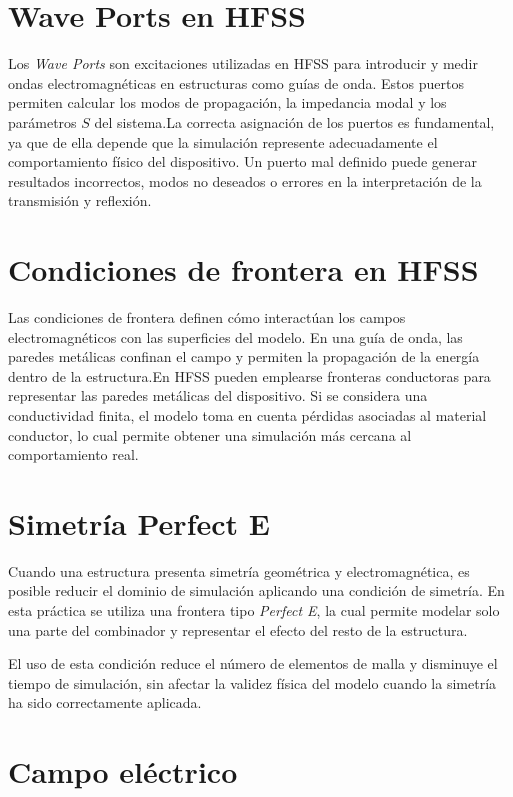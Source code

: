 \section{Wave Ports en HFSS}

Los \textit{Wave Ports} son excitaciones utilizadas en HFSS para introducir y medir ondas electromagnéticas en estructuras como guías de onda. Estos puertos permiten calcular los modos de propagación, la impedancia modal y los parámetros $S$ del sistema.La correcta asignación de los puertos es fundamental, ya que de ella depende que la simulación represente adecuadamente el comportamiento físico del dispositivo. Un puerto mal definido puede generar resultados incorrectos, modos no deseados o errores en la interpretación de la transmisión y reflexión.

\section{Condiciones de frontera en HFSS}

Las condiciones de frontera definen cómo interactúan los campos electromagnéticos con las superficies del modelo. En una guía de onda, las paredes metálicas confinan el campo y permiten la propagación de la energía dentro de la estructura.En HFSS pueden emplearse fronteras conductoras para representar las paredes metálicas del dispositivo. Si se considera una conductividad finita, el modelo toma en cuenta pérdidas asociadas al material conductor, lo cual permite obtener una simulación más cercana al comportamiento real.

\section{Simetría Perfect E}

Cuando una estructura presenta simetría geométrica y electromagnética, es posible reducir el dominio de simulación aplicando una condición de simetría. En esta práctica se utiliza una frontera tipo \textit{Perfect E}, la cual permite modelar solo una parte del combinador y representar el efecto del resto de la estructura.

El uso de esta condición reduce el número de elementos de malla y disminuye el tiempo de simulación, sin afectar la validez física del modelo cuando la simetría ha sido correctamente aplicada.

\section{Campo eléctrico}

